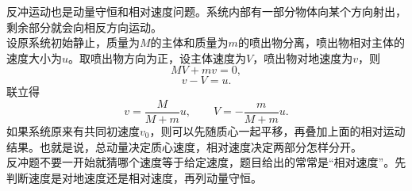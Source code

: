 \begin{casetypebox}[title={\strut\textcolor{white}{\bfseries 常见题型：反冲运动}}]
反冲运动也是动量守恒和相对速度问题。系统内部有一部分物体向某个方向射出，剩余部分就会向相反方向运动。\\
设原系统初始静止，质量为$M$的主体和质量为$m$的喷出物分离，喷出物相对主体的速度大小为$u$。取喷出物方向为正，设主体速度为$V$，喷出物对地速度为$v$，则
\[
  M V+mv=0,
\]
\[
  v-V=u.
\]
联立得
\[
  v=\frac{M}{M+m}u,\qquad
  V=-\frac{m}{M+m}u.
\]
如果系统原来有共同初速度$v_0$，则可以先随质心一起平移，再叠加上面的相对运动结果。也就是说，总动量决定质心速度，相对速度决定两部分怎样分开。\\
反冲题不要一开始就猜哪个速度等于给定速度，题目给出的常常是“相对速度”。先判断速度是对地速度还是相对速度，再列动量守恒。
\end{casetypebox}

